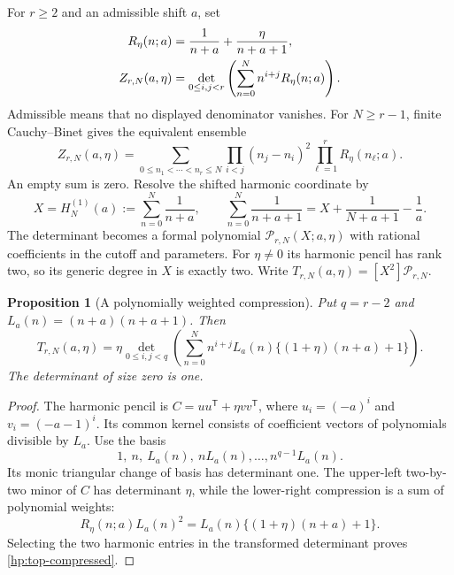 \documentclass[11pt,a4paper]{article}
\newtheorem{proposition}[theorem]{Proposition}
\theoremstyle{definition}
\theoremstyle{remark}
\numberwithin{equation}{section}
\begin{document}
For $r\ge2$ and an admissible shift $a$, set
\begin{align}
 R_\eta(n;a)&=\frac1{n+a}+\frac{\eta}{n+a+1},\notag\\
 Z_{r,N}(a,\eta)
 &=\det_{0\le i,j<r}
       \left(\sum_{n=0}^N n^{i+j}R_\eta(n;a)\right).
 \label{hp:ensemble}
\end{align}
Admissible means that no displayed denominator vanishes. For
$N\ge r-1$, finite Cauchy--Binet gives the equivalent ensemble
\begin{equation}\label{hp:vandermonde}
 Z_{r,N}(a,\eta)=
 \sum_{0\le n_1<\cdots<n_r\le N}
       \prod_{i<j}(n_j-n_i)^2\prod_{\ell=1}^rR_\eta(n_\ell;a).
\end{equation}
An empty sum is zero. Resolve the shifted harmonic coordinate by
\[
 X=H_N^{(1)}(a):=\sum_{n=0}^N\frac1{n+a},
 \qquad
 \sum_{n=0}^N\frac1{n+a+1}
 =X+\frac1{N+a+1}-\frac1a.
\]
The determinant becomes a formal polynomial
$\mathcal P_{r,N}(X;a,\eta)$ with rational coefficients in the
cutoff and parameters. For $\eta\ne0$ its harmonic pencil has rank
two, so its generic degree in $X$ is exactly two. Write
$T_{r,N}(a,\eta)=[X^2]\mathcal P_{r,N}$.

\begin{proposition}[A polynomially weighted compression]
\label{hp:compression}
Put $q=r-2$ and $L_a(n)=(n+a)(n+a+1)$. Then
\begin{equation}\label{hp:top-compressed}
 \boxed{\displaystyle
 T_{r,N}(a,\eta)=\eta
 \det_{0\le i,j<q}\left(
 \sum_{n=0}^N n^{i+j}L_a(n)
                   \{(1+\eta)(n+a)+1\}\right).}
\end{equation}
The determinant of size zero is one.
\end{proposition}
\begin{proof}
The harmonic pencil is $C=uu^{\mathsf T}+\eta vv^{\mathsf T}$,
where $u_i=(-a)^i$ and $v_i=(-a-1)^i$. Its common kernel consists
of coefficient vectors of polynomials divisible by $L_a$. Use the
basis
\[
 1,\ n,\ L_a(n),\ nL_a(n),\ldots,n^{q-1}L_a(n).
\]
Its monic triangular change of basis has determinant one. The
upper-left two-by-two minor of $C$ has determinant $\eta$, while
the lower-right compression is a sum of polynomial weights:
\[
 R_\eta(n;a)L_a(n)^2
   =L_a(n)\{(1+\eta)(n+a)+1\}.
\]
Selecting the two harmonic entries in the transformed determinant
proves \eqref{hp:top-compressed}.
\end{proof}
\end{document}

